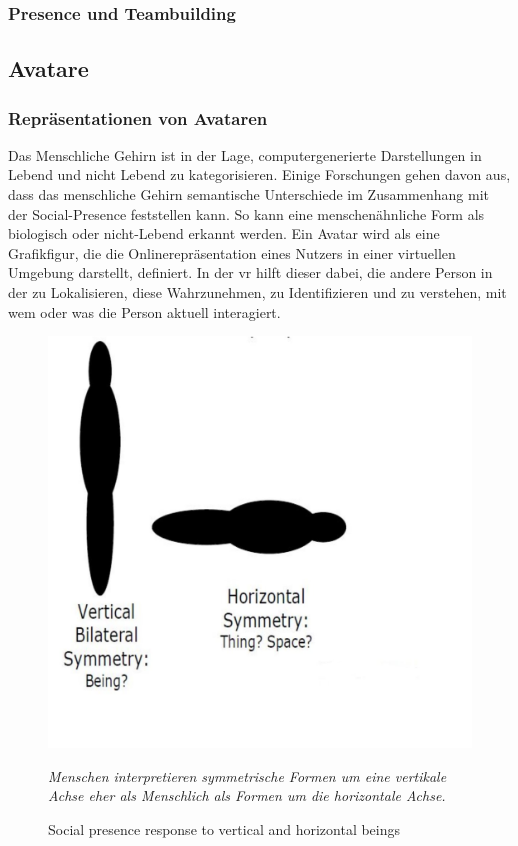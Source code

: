 \documentclass[a4paper,11pt]{article}%
\renewcommand{\\}{\vspace*{0.5\baselineskip} \newline}
\begin{document}
\subsubsection{Presence und Teambuilding}

\newpage

\subsection{Avatare}
\label{Avatare}
\subsubsection{Repräsentationen von Avataren}

Das Menschliche Gehirn ist in der Lage, computergenerierte Darstellungen in \dq{}Lebend und nicht Lebend\dq{} zu kategorisieren. Einige Forschungen gehen davon aus, dass das menschliche Gehirn semantische Unterschiede im Zusammenhang mit der \dq{}Social-Presence\dq{} feststellen kann. So kann eine menschenähnliche Form als biologisch oder nicht-Lebend erkannt werden. 
Ein Avatar wird als eine Grafikfigur, die die Onlinerepräsentation eines Nutzers in einer virtuellen Umgebung darstellt, definiert. \citep[p.1]{neustaedter2009presenting} In der \ac{vr} hilft dieser dabei, die andere Person in der zu Lokalisieren, diese Wahrzunehmen, zu Identifizieren und zu verstehen, mit wem oder was die Person aktuell interagiert. \citep[]{pan2017impact}

	\begin{figure}[b!]
		\begin{footnotesize}
		\centering
			\includegraphics[scale= 0.3]{Abbildungen/Symmetry.JPG}
			\caption[Abbildung 1]{Social presence response to vertical and
horizontal beings}
			\textit{Menschen interpretieren symmetrische Formen um eine vertikale Achse eher als \dq{}Menschlich\dq{} als Formen um die horizontale Achse. \citep{biocca2002defining} }
			\label{vertical_horizontal}
		\end{footnotesize}
	\end{figure}
\end{document}
